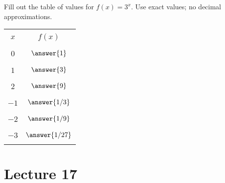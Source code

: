 \documentclass{ximera}
\begin{document}
\begin{problem}\label{prob:160hom7prob3}
Fill out the table of values for $f(x)=3^x$.  Use exact values; no decimal approximations.
\begin{center}
\begin{tabular}{|c|c|}
 \hline
 &   \\
 $x$& $f(x)$ \\
 &  \\
  \hline
  &  \\
 $0$ & $\answer{1}$ \\
  & \\
 \hline
  & \\
 $1$ & $\answer{3}$ \\
  & \\
 \hline
  & \\
  $2$ & $\answer{9}$  \\
  & \\
 \hline
 & \\
  $-1$ & $\answer{1/3}$  \\
  & \\
 \hline
 & \\
  $-2$ & $\answer{1/9}$  \\
  & \\
 \hline
 & \\
  $-3$ & $\answer{1/27}$  \\
  & \\
 \hline
 \end{tabular}
\end{center}    
\end{problem}

 \section{Lecture 17}
 
\end{document}
